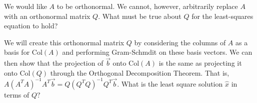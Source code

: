 \begin{enumerate}
\qitem We would like $A$ to be orthonormal. We cannot, however, arbitrarily replace $A$ with an orthonormal matrix $Q$. What must be true about $Q$ for the least-squares equation to hold?


\qitem We will create this orthonormal matrix $Q$ by considering the columns of $A$ as a basis for $\text{Col}(A)$ and performing Gram-Schmdit on these basis vectors. We can then show that the projection of $\vec{b}$ onto $\text{Col}(A)$ is the same as projecting it onto $\text{Col}(Q)$ through the Orthogonal Decomposition Theorem. That is, $A (A^{T}A)^{-1} A^{T} \vec{b} = Q (Q^{T} Q)^{-1} Q^{T} \vec{b}.$ What is the least square solution $\hat{x}$ in terms of $Q?$







\end{enumerate}